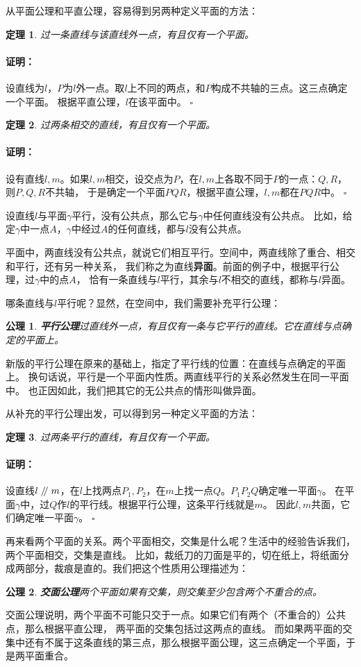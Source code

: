 \documentclass[12pt,UTF8]{ctexbook}
\newtheorem{tm}{定理}[section]
\renewenvironment{proof}{\paragraph{\textbf{证明：}}}{\hfill$\square$}
\newtheorem{po}{公理}
\renewcommand\parallel{\mathrel{/\mskip-4mu/}}
\begin{document}
从平面公理和平直公理，容易得到另两种定义平面的方法：
\begin{tm}\label{tm:1-0-0}
    过一条直线与该直线外一点，有且仅有一个平面。
\end{tm}
\begin{proof}
    设直线为$l$，$P$为$l$外一点。取$l$上不同的两点，和$P$构成不共轴的三点。这三点确定一个平面。
    根据平直公理，$l$在该平面中。
\end{proof}
\begin{tm}\label{tm:1-0-1}
    过两条相交的直线，有且仅有一个平面。
\end{tm}
\begin{proof}
    设有直线$l,m$。如果$l,m$相交，设交点为$P$，在$l,m$上各取不同于$P$的一点：$Q,R$，则$P,Q,R$不共轴，
    于是确定一个平面$PQR$，根据平直公理，$l,m$都在$PQR$中。
\end{proof}

设直线$l$与平面$\gamma$平行，没有公共点，那么它与$\gamma$中任何直线没有公共点。
比如，给定$\gamma$中一点$A$，$\gamma$中经过$A$的任何直线，都与$l$没有公共点。

平面中，两直线没有公共点，就说它们相互平行。空间中，两直线除了重合、相交和平行，还有另一种关系，
我们称之为直线\textbf{异面}。前面的例子中，根据平行公理，过$\gamma$中的点$A$，
恰有一条直线与$l$平行，其余与$l$不相交的直线，都称与$l$异面。

哪条直线与$l$平行呢？显然，在空间中，我们需要补充平行公理：
\begin{po}{\textbf{平行公理}}\label{po:2}
    过直线外一点，有且仅有一条与它平行的直线。它在直线与点确定的平面上。
\end{po}
新版的平行公理在原来的基础上，指定了平行线的位置：在直线与点确定的平面上。
换句话说，平行是一个平面内性质。两直线平行的关系必然发生在同一平面中。
也正因如此，我们把其它的无公共点的情形叫做异面。

从补充的平行公理出发，可以得到另一种定义平面的方法：
\begin{tm}\label{tm:1-0-2}
    过两条平行的直线，有且仅有一个平面。
\end{tm}
\begin{proof}
    设直线$l \parallel m$，在$l$上找两点$P_1,P_2$，在$m$上找一点$Q$。$P_1P_2Q$确定唯一平面$\gamma$。
    在平面$\gamma$中，过$Q$作$l$的平行线。根据平行公理，这条平行线就是$m$。
    因此$l,m$共面，它们确定唯一平面$\gamma$。
\end{proof}

再来看两个平面的关系。两个平面相交，交集是什么呢？生活中的经验告诉我们，两个平面相交，交集是直线。
比如，裁纸刀的刀面是平的，切在纸上，将纸面分成两部分，裁痕是直的。我们把这个性质用公理描述为：
\begin{po}{\textbf{交面公理}}\label{po:3}
    两个平面如果有交集，则交集至少包含两个不重合的点。
\end{po}
交面公理说明，两个平面不可能只交于一点。如果它们有两个（不重合的）公共点，那么根据平直公理，
两平面的交集包括过这两点的直线。
而如果两平面的交集中还有不属于这条直线的第三点，那么根据平面公理，这三点确定一个平面，于是两平面重合。
\end{document}
